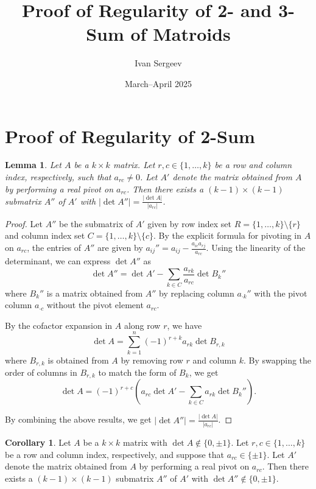 \documentclass{article}
\title{Proof of Regularity of 2- and 3-Sum of Matroids}
\author{Ivan Sergeev}
\date{March--April 2025}
\newtheorem{lemma}{Lemma}
\theoremstyle{definition}
\newtheorem{corollary}{Corollary}
\begin{document}
\maketitle

\section{Proof of Regularity of 2-Sum}

\begin{lemma}\label{lem:pivot_smaller_det}
    Let $A$ be a $k \times k$ matrix. Let $r, c \in \{1, \dots, k\}$ be a row and column index, respectively, such that $a_{rc} \neq 0$. Let $A'$ denote the matrix obtained from $A$ by performing a real pivot on $a_{rc}$. Then there exists a $(k - 1) \times (k - 1)$ submatrix $A''$ of $A'$ with $|\det A''| = \frac{|\det A|}{|a_{rc}|}$.
\end{lemma}

\begin{proof}
    Let $A''$ be the submatrix of $A'$ given by row index set $R = \{1, \dots, k\} \setminus \{r\}$ and column index set $C = \{1, \dots, k\} \setminus \{c\}$. By the explicit formula for pivoting in $A$ on $a_{rc}$, the entries of $A''$ are given by $a_{ij}'' = a_{ij} - \frac{a_{ic} a_{rj}}{a_{rc}}$. Using the linearity of the determinant, we can express $\det A''$ as
    \[
        \det A'' = \det A' - \sum_{k \in C} \frac{a_{rk}}{a_{rc}} \det B_{k}''
    \]
    where $B_{k}''$ is a matrix obtained from $A''$ by replacing column $a_{\cdot k}''$ with the pivot column $a_{\cdot c}$ without the pivot element $a_{rc}$.

    By the cofactor expansion in $A$ along row $r$, we have
    \[
        \det A = \sum_{k = 1}^{n} (-1)^{r + k} a_{rk} \det B_{r, k}
    \]
    where $B_{r, k}$ is obtained from $A$ by removing row $r$ and column $k$. By swapping the order of columns in $B_{r, k}$ to match the form of $B_{k}$, we get
    \[
        \det A = (-1)^{r + c} (a_{rc} \det A' - \sum_{k \in C} a_{rk} \det B_{k}'').
    \]

    By combining the above results, we get $|\det A''| = \frac{|\det A|}{|a_{rc}|}$.
\end{proof}

\begin{corollary}\label{cor:pivot_smaller_det}
    Let $A$ be a $k \times k$ matrix with $\det A \notin \{0, \pm 1\}$. Let $r, c \in \{1, \dots, k\}$ be a row and column index, respectively, and suppose that $a_{rc} \in \{\pm 1\}$. Let $A'$ denote the matrix obtained from $A$ by performing a real pivot on $a_{rc}$. Then there exists a $(k - 1) \times (k - 1)$ submatrix $A''$ of $A'$ with $\det A'' \notin \{0, \pm 1\}$.
\end{corollary}
\end{document}
